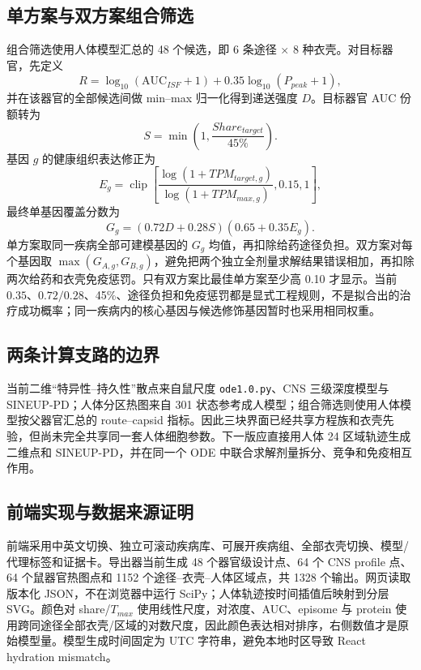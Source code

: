 \documentclass[UTF8,11pt,a4paper]{ctexart}
\newcommand{\AUC}{\mathrm{AUC}}
\newcommand{\code}[1]{\texttt{#1}}
\begin{document}
\subsection{单方案与双方案组合筛选}
组合筛选使用人体模型汇总的 48 个候选，即 6 条途径 $\times$ 8 种衣壳。对目标器官，先定义
\begin{equation}
R=\log_{10}(\AUC_{ISF}+1)+0.35\log_{10}(P_{peak}+1),
\end{equation}
并在该器官的全部候选间做 min--max 归一化得到递送强度 $D$。目标器官 AUC 份额转为
\begin{equation}
S=\min\left(1,\frac{Share_{target}}{45\%}\right).
\end{equation}
基因 $g$ 的健康组织表达修正为
\begin{equation}
E_g=\operatorname{clip}\left[
\frac{\log(1+TPM_{target,g})}{\log(1+TPM_{max,g})},0.15,1
\right],
\end{equation}
最终单基因覆盖分数为
\begin{equation}
G_g=(0.72D+0.28S)(0.65+0.35E_g).
\end{equation}
单方案取同一疾病全部可建模基因的 $G_g$ 均值，再扣除给药途径负担。双方案对每个基因取 $\max(G_{A,g},G_{B,g})$，避免把两个独立全剂量求解结果错误相加，再扣除两次给药和衣壳免疫惩罚。只有双方案比最佳单方案至少高 0.10 才显示。当前 $0.35$、$0.72/0.28$、45\%、途径负担和免疫惩罚都是显式工程规则，不是拟合出的治疗成功概率；同一疾病内的核心基因与候选修饰基因暂时也采用相同权重。

\subsection{两条计算支路的边界}
当前二维“特异性--持久性”散点来自鼠尺度 \code{ode1.0.py}、CNS 三级深度模型与 SINEUP-PD；人体分区热图来自 301 状态参考成人模型；组合筛选则使用人体模型按父器官汇总的 route--capsid 指标。因此三块界面已经共享方程族和衣壳先验，但尚未完全共享同一套人体细胞参数。下一版应直接用人体 24 区域轨迹生成二维点和 SINEUP-PD，并在同一个 ODE 中联合求解剂量拆分、竞争和免疫相互作用。

\subsection{前端实现与数据来源证明}
前端采用中英文切换、独立可滚动疾病库、可展开疾病组、全部衣壳切换、模型/代理标签和证据卡。导出器当前生成 48 个器官级设计点、64 个 CNS profile 点、64 个鼠器官热图点和 1152 个途径--衣壳--人体区域点，共 1328 个输出。网页读取版本化 JSON，不在浏览器中运行 SciPy；人体轨迹按时间插值后映射到分层 SVG。颜色对 share/$T_{max}$ 使用线性尺度，对浓度、AUC、episome 与 protein 使用跨同途径全部衣壳/区域的对数尺度，因此颜色表达相对排序，右侧数值才是原始模型量。模型生成时间固定为 UTC 字符串，避免本地时区导致 React hydration mismatch。
\end{document}
